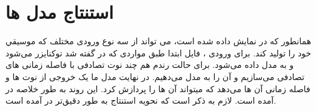 \section{استنتاج مدل ها}
همانطور که در  نمایش داده شده است، می تواند از سه نوع ورودی  مختلف که موسیقي خود را تولید کند.
برای ورودی ، فایل ابتدا طبق مواردی که در  گفته شد توکنایزر می‌شود و به مدل داده می‌شود.
برای حالت رندم هم چند نوت تصادفی با فاصله زمانی های تصادفی می‌سازیم و آن را به مدل می‌دهیم. در نهایت مدل ما یک خروجی از نوت ها
و فاصله زمانی آن ها می‌دهد که میتواند آن ها را پردازش کرد.
این روند به طور خلاصه در  آمده است. لازم به ذکر است که نحویه استنتاج  به طور دقیق‌تر در   آمده است.
\begin{figure}
      \begin{LTR}
            \setmainfont{Times New Roman}


\end{LTR}
\end{figure}
